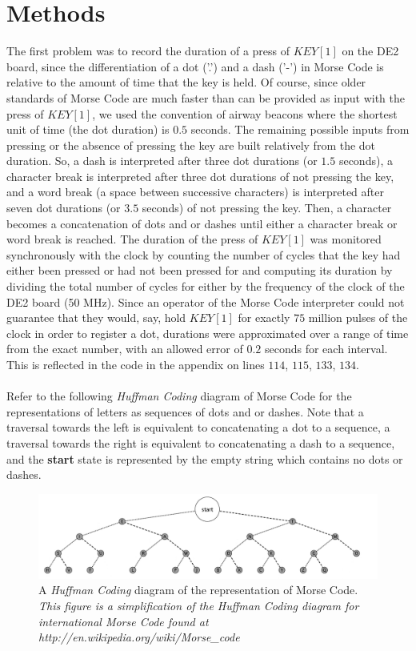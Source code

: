 \documentclass[12pt, letterpaper, english]{article}
\begin{document}
\section*{Methods}
\indent\indent The first problem was to record the duration of a press of $KEY[1]$ on the DE2 board, since the differentiation of a dot ('.') and a dash ('-') in Morse Code is relative to the amount of time that the key is held. Of course, since older standards of Morse Code are much faster than can be provided as input with the press of $KEY[1]$, we used the convention of airway beacons where the shortest unit of time (the dot duration) is $0.5$ seconds. The remaining possible inputs from pressing or the absence of pressing the key are built relatively from the dot duration. So, a dash is interpreted after three dot durations (or $1.5$ seconds), a character break is interpreted after three dot durations of not pressing the key, and a word break (a space between successive characters) is interpreted after seven dot durations (or $3.5$ seconds) of not pressing the key. Then, a character becomes a concatenation of dots and or dashes until either a character break or word break is reached. The duration of the press of $KEY[1]$ was monitored synchronously with the clock by counting the number of cycles that the key had either been pressed or had not been pressed for and computing its duration by dividing the total number of cycles for either by the frequency of the clock of the DE2 board (50 MHz). Since an operator of the Morse Code interpreter could not guarantee that they would, say, hold $KEY[1]$ for exactly $75$ million pulses of the clock in order to register a dot, durations were approximated over a range of time from the exact number, with an allowed error of $0.2$ seconds for each interval. This is reflected in the code in the appendix on lines $114$, $115$, $133$, $134$.\\\\ 
\indent Refer to the following \textit{Huffman Coding} diagram of Morse Code for the representations of letters as sequences of dots and or dashes. Note that a traversal towards the left is equivalent to concatenating a dot to a sequence, a traversal towards the right is equivalent to concatenating a dash to a sequence, and the \textbf{start} state is represented by the empty string which contains no dots or dashes.
\begin{figure}[h!]
\includegraphics[width = \textwidth]{Tree_Fix.jpg}\caption{A \textit{Huffman Coding} diagram of the representation of Morse Code. \textit{This figure is a simplification of the Huffman Coding diagram for international Morse Code found at http://en.wikipedia.org/wiki/Morse\_code}}
\end{figure}\\\\
\end{document}
